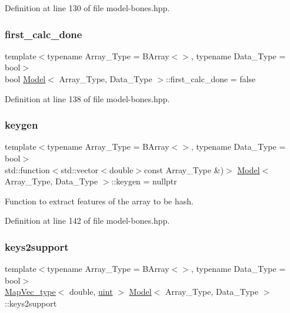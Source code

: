 Definition at line 130 of file model-\/bones.\+hpp.

\mbox{\label{class_model_aeef0171c5c34e3e694cb51eebc449596}} 
\subsubsection{\texorpdfstring{first\+\_\+calc\+\_\+done}{first\_calc\_done}}
{\footnotesize\ttfamily template$<$typename Array\+\_\+\+Type  = B\+Array$<$$>$, typename Data\+\_\+\+Type  = bool$>$ \\
bool \hyperlink{class_model}{Model}$<$ Array\+\_\+\+Type, Data\+\_\+\+Type $>$\+::first\+\_\+calc\+\_\+done = false}



Definition at line 138 of file model-\/bones.\+hpp.

\mbox{\label{class_model_a087db7c5e2ee47f4353d2e181223dd5a}} 
\subsubsection{\texorpdfstring{keygen}{keygen}}
{\footnotesize\ttfamily template$<$typename Array\+\_\+\+Type  = B\+Array$<$$>$, typename Data\+\_\+\+Type  = bool$>$ \\
std\+::function$<$std\+::vector$<$double$>$const Array\+\_\+\+Type \&)$>$ \hyperlink{class_model}{Model}$<$ Array\+\_\+\+Type, Data\+\_\+\+Type $>$\+::keygen = nullptr}



Function to extract features of the array to be hash. 



Definition at line 142 of file model-\/bones.\+hpp.

\mbox{\label{class_model_a83d72b83e29ccaf09a5a05d2a67d0f05}} 
\subsubsection{\texorpdfstring{keys2support}{keys2support}}
{\footnotesize\ttfamily template$<$typename Array\+\_\+\+Type  = B\+Array$<$$>$, typename Data\+\_\+\+Type  = bool$>$ \\
\hyperlink{typedefs_8hpp_a02ed8dec96bc528c8bc3d8cb3c4674a5}{Map\+Vec\+\_\+type}$<$ double, \hyperlink{typedefs_8hpp_a91ad9478d81a7aaf2593e8d9c3d06a14}{uint} $>$ \hyperlink{class_model}{Model}$<$ Array\+\_\+\+Type, Data\+\_\+\+Type $>$\+::keys2support}



